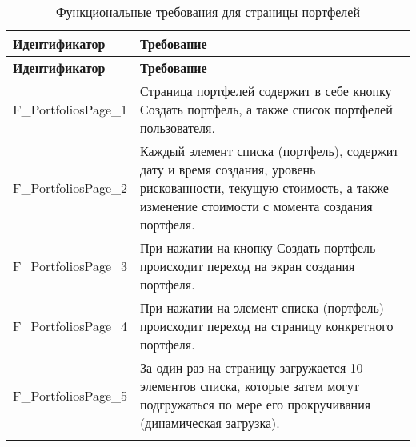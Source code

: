 \documentclass[a4paper, 14pt]{article}
\begin{document}
\begin{longtable}{| p{} | p{} |}
    \hline
    \textbf{Идентификатор}          & \textbf{Требование}                                                                                                                                                                \\
    \hline
    \endfirsthead
    \hline
    \textbf{Идентификатор}          & \textbf{Требование}                                                                                                                                                                \\
    \hline
    \endhead

    F\_PortfoliosPage\_1      & Страница портфелей содержит в себе кнопку Создать портфель, а также список портфелей пользователя.                                                                 \\ \hline
    F\_PortfoliosPage\_2      & Каждый элемент списка (портфель), содержит дату и время создания, уровень рискованности, текущую стоимость, а также изменение стоимости с момента создания портфеля.                                                               \\ \hline
    F\_PortfoliosPage\_3      & При нажатии на кнопку Создать портфель происходит переход на экран создания портфеля.                                                                                  \\ \hline
    F\_PortfoliosPage\_4      & При нажатии на элемент списка (портфель) происходит переход на страницу конкретного портфеля.                                                                           \\ \hline
    F\_PortfoliosPage\_5                & За один раз на страницу загружается 10 элементов списка, которые затем могут подгружаться по мере его прокручивания (динамическая загрузка).                             \\ \hline

    \caption{Функциональные требования для страницы портфелей}
\end{longtable}
\end{document}
